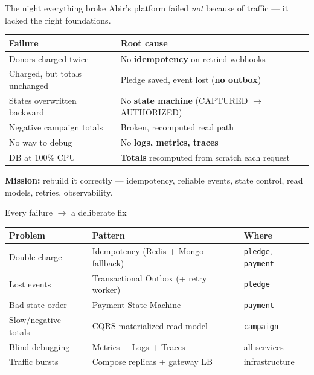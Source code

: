 \documentclass[aspectratio=169]{beamer}
\newcommand{\svc}[1]{\textcolor{brandblue}{\texttt{#1}}}
\begin{document}
\begin{frame}{The night everything broke}
  Abir's platform failed \emph{not} because of traffic --- it lacked the right foundations.
  \vspace{0.4em}
  \begin{table}
    \centering\small
    \begin{tabular}{@{}ll@{}}
      \toprule
      \textcolor{brandred}{Failure} & Root cause \\
      \midrule
      Donors charged twice & No \textbf{idempotency} on retried webhooks \\
      Charged, but totals unchanged & Pledge saved, event lost (\textbf{no outbox}) \\
      States overwritten backward & No \textbf{state machine} (CAPTURED $\rightarrow$ AUTHORIZED) \\
      Negative campaign totals & Broken, recomputed read path \\
      No way to debug & No \textbf{logs, metrics, traces} \\
      DB at 100\% CPU & \textbf{Totals} recomputed from scratch each request \\
      \bottomrule
    \end{tabular}
  \end{table}
  \vspace{0.3em}
  \begin{center}\textbf{Mission:} rebuild it correctly --- idempotency, reliable events, state control, read models, retries, observability.\end{center}
\end{frame}

\begin{frame}{Every failure $\rightarrow$ a deliberate fix}
  \begin{table}\centering\small
    \begin{tabular}{@{}lll@{}}
      \toprule
      Problem & Pattern & Where \\
      \midrule
      Double charge & Idempotency (Redis + Mongo fallback) & \svc{pledge}, \svc{payment} \\
      Lost events & Transactional Outbox (+ retry worker) & \svc{pledge} \\
      Bad state order & Payment State Machine & \svc{payment} \\
      Slow/negative totals & CQRS materialized read model & \svc{campaign} \\
      Blind debugging & Metrics + Logs + Traces & all services \\
      Traffic bursts & Compose replicas + gateway LB & infrastructure \\
      \bottomrule
    \end{tabular}
  \end{table}
\end{frame}
\end{document}
